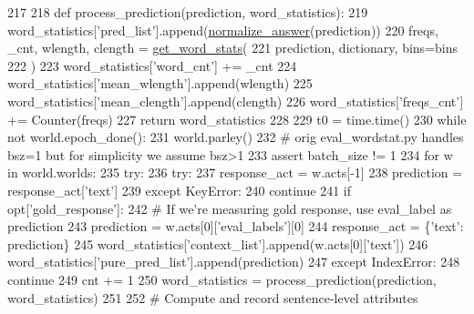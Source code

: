 \begin{DoxyCode}
{{{{{{{{{217 
218     \textcolor{keyword}{def }process\_prediction(prediction, word\_statistics):
219         word\_statistics[\textcolor{stringliteral}{'pred\_list'}].append(\hyperlink{namespaceparlai_1_1core_1_1metrics_ae7769a6b628f41081e0f43043d52031a}{normalize\_answer}(prediction))
220         freqs, \_cnt, wlength, clength = \hyperlink{namespaceprojects_1_1controllable__dialogue_1_1eval__wordstat_af8f7aeddab4a5c7f0a5597bdb09f40ae}{get\_word\_stats}(
221             prediction, dictionary, bins=bins
222         )
223         word\_statistics[\textcolor{stringliteral}{'word\_cnt'}] += \_cnt
224         word\_statistics[\textcolor{stringliteral}{'mean\_wlength'}].append(wlength)
225         word\_statistics[\textcolor{stringliteral}{'mean\_clength'}].append(clength)
226         word\_statistics[\textcolor{stringliteral}{'freqs\_cnt'}] += Counter(freqs)
227         \textcolor{keywordflow}{return} word\_statistics
228 
229     t0 = time.time()
230     \textcolor{keywordflow}{while} \textcolor{keywordflow}{not} world.epoch\_done():
231         world.parley()
232         \textcolor{comment}{# orig eval\_wordstat.py handles bsz=1 but for simplicity we assume bsz>1}
233         \textcolor{keyword}{assert} batch\_size != 1
234         \textcolor{keywordflow}{for} w \textcolor{keywordflow}{in} world.worlds:
235             \textcolor{keywordflow}{try}:
236                 \textcolor{keywordflow}{try}:
237                     response\_act = w.acts[-1]
238                     prediction = response\_act[\textcolor{stringliteral}{'text'}]
239                 \textcolor{keywordflow}{except} KeyError:
240                     \textcolor{keywordflow}{continue}
241                 \textcolor{keywordflow}{if} opt[\textcolor{stringliteral}{'gold\_response'}]:
242                     \textcolor{comment}{# If we're measuring gold response, use eval\_label as prediction}
243                     prediction = w.acts[0][\textcolor{stringliteral}{'eval\_labels'}][0]
244                     response\_act = \{\textcolor{stringliteral}{'text'}: prediction\}
245                 word\_statistics[\textcolor{stringliteral}{'context\_list'}].append(w.acts[0][\textcolor{stringliteral}{'text'}])
246                 word\_statistics[\textcolor{stringliteral}{'pure\_pred\_list'}].append(prediction)
247             \textcolor{keywordflow}{except} IndexError:
248                 \textcolor{keywordflow}{continue}
249             cnt += 1
250             word\_statistics = process\_prediction(prediction, word\_statistics)
251 
252             \textcolor{comment}{# Compute and record sentence-level attributes}
}}}}}}}}}
\end{DoxyCode}

